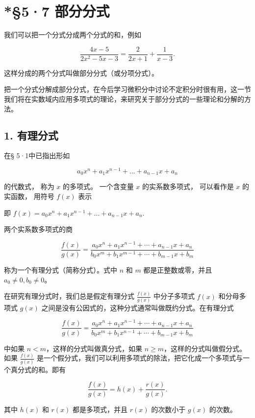 \section{*§5·7 部分分式}

我们可以把一个分式分成两个分式的和，例如

\[
\frac {4 x - 5}{2 x ^ {2} - 5 x - 3} = \frac {2}{2 x + 1} + \frac {1}{x - 3}.
\]

这样分成的两个分式叫做部分分式（或分项分式）。

把一个分式分解成部分分式，在今后学习微积分中讨论不定积分时很有用，这一节我们将在实数域内应用多项式的理论，来研究关于部分分式的一些理论和分解的方法。

\subsection{1. 有理分式}

在§ 5·1中已指出形如

\[
a _ {0} x ^ {n} + a _ {1} x ^ {n - 1} + \dots + a _ {n - 1} x + a _ {n}
\]

的代数式， 称为 \(x\) 的多项式。 一个含变量 \(x\) 的实系数多项式，
可以看作是 \(x\) 的实函数， 用符号 \(f(x)\) 表示

即 \(f(x) = a_0x^n + a_1x^{n-1} + \dots + a_{n-1}x + a_n.\)

两个实系数多项式的商

\[
\frac {f (x)}{g (x)} = \frac {a _ {0} x ^ {n} + a _ {1} x ^ {n - 1} + \cdots + a _ {n - 1} x + a _ {n}}{b _ {0} x ^ {m} + b _ {1} x ^ {m - 1} + \cdots + b _ {m - 1} x + b _ {m}} \tag {1}
\]

称为一个有理分式（简称分式）。式中 \(n\) 和 \(m\) 都是正整数或零，并且
\(a_0 \neq 0, b_0 \neq 0\)。

在研究有理分式时，我们总是假定有理分式 \(\frac{f(x)}{g(x)}\)
中分子多项式 \(f(x)\) 和分母多项式 \(g(x)\)
之间是没有公因式的，这种分式通常叫做既约分式。在有理分式

\[
\frac {f (x)}{g (x)} = \frac {a _ {0} x ^ {n} + a _ {1} x ^ {n - 1} + \cdots + a _ {n - 1} x + a _ {n}}{b _ {0} x ^ {m} + b _ {1} x ^ {n - 1} + \cdots + b _ {m - 1} x + b _ {m}}
\]

中如果 \(n < m\)，这样的分式叫做真分式，如果
\(n \geqslant m\)，这样的分式叫做假分式。如果 \(\frac{f(x)}{g(x)}\)
是一个假分式，我们可以利用多项式的除法，把它化成一个多项式与一个真分式的和。即有

\[
\frac {f (x)}{g (x)} = h (x) + \frac {r (x)}{g (x)}.
\]

其中 \(h(x)\) 和 \(r(x)\) 都是多项式，并且 \(r(x)\) 的次数小于 \(g(x)\)
的次数。

